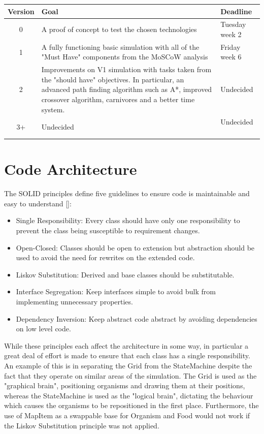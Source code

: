 \documentclass[a4paper, oneside, 11pt]{report}
\begin{document}
\smallskip 
\begin{tabular}{c|p{}|l}
	Version & Goal & Deadline \\ \hline
	0 & A proof of concept to test the chosen technologies & Tuesday week 2 \\ \hline
	1 & A fully functioning basic simulation with all of the "Must Have" components from the MoSCoW analysis & Friday week 6 \\ \hline
	2 & Improvements on V1 simulation with tasks taken from the "should have" objectives. In particular, an advanced path finding algorithm such as A*, improved crossover algorithm, carnivores and a better time system. & Undecided \\ \hline
	3+ & Undecided & Undecided \
\end{tabular}
\smallskip 

\section{Code Architecture}\label{architecture}
The SOLID principles define five guidelines to ensure code is maintainable and easy to understand [\cite{kelmendi}]: 
\begin{itemize}
	\item Single Responsibility: Every class should have only one responsibility to prevent the class being susceptible to requirement changes.
	\item Open-Closed: Classes should be open to extension but abstraction should be used to avoid the need for rewrites on the extended code.
	\item Liskov Substitution: Derived and base classes should be substitutable.
	\item Interface Segregation: Keep interfaces simple to avoid bulk from implementing unnecessary properties.
	\item Dependency Inversion: Keep abstract code abstract by avoiding dependencies on low level code.
\end{itemize}

While these principles each affect the architecture in some way, in particular a great deal of effort is made to ensure that each class has a single responsibility. An example of this is in separating the Grid from the StateMachine despite the fact that they operate on similar areas of the simulation. The Grid is used as the "graphical brain", positioning organisms and drawing them at their positions, whereas the StateMachine is used as the "logical brain", dictating the behaviour which causes the organisms to be repositioned in the first place. Furthermore, the use of MapItem as a swappable base for Organism and Food would not work if the Liskov Substitution principle was not applied.
\end{document}
